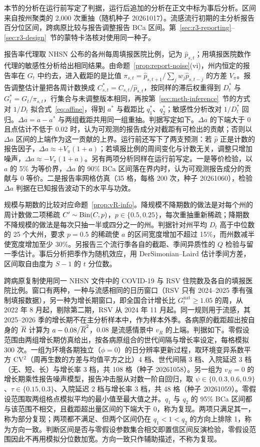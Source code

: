 本节的分析在运行前写定了判据，运行后追加的分析在正文中标为事后分析。区间来自按州聚类的 2,000 次重抽（随机种子 20261017）。流感流行初期的主分析报告百分位区间，跨病原比较与报告调整报告 BCa 区间。第~\ref{sec:r3-reporting}--\ref{sec:r3-design}~节的蒙特卡洛核对使用同一种子。

报告率代理取 NHSN 公布的各州每周填报医院比例，记为 $\hat p_{s,t}$；用填报医院数作代理的敏感性分析给出相同结果。由命题~\ref{prop:report-noise}(vi)，州内恒定的报告率在 $G_t$ 中约去，进入截距的是比值 $\pi_{s,t}=\hat p_{s,t+1}/\sum_jw_j\hat p_{s,t-j}$ 的方差 $V_\pi$。报告调整估计量把各周计数换成 $C^*_{s,t}=C_{s,t}/\hat p_{s,t}$，按同样的滞后权重得到 $D^*_t$ 与 $G^*_t=G_t/\pi_{s,t}$，行集合与未调整版本相同，再按第~\ref{sec:meth-inference}~节的方式对 $1/D_t$ 拟合式~\eqref{eq:affine}，得到 $a^*$ 与截距比 $q_1^*$、$q_2^*$；敏感性分析改对 $1/D^*_t$ 回归。$\Delta a=a-a^*$ 与两组截距共用同一组重抽。判据写定如下。$\Delta a$ 的下端大于 0 且点估计不低于 0.02 时，认为可观测的报告成分对截距有可检出的贡献；否则以 $\Delta a$ 区间的上端作为这一贡献的上界。运行前还写下了两支预测：若 $\hat p$ 正是计数的报告因子，$\Delta a\approx+V_\pi(1+a)$；若填报比例的周间变化与计数无关，调整只增加噪声，$\Delta a\approx-V_\pi(1+a)$。另有两项分析同样在运行前写定。一是等价检验，以 $a$ 的 5\% 为等价界，$\Delta a$ 的 90\% BCa 区间落在界内时，认为可观测报告成分的贡献与 0 等价。二是报告率网格仿真（35 格，每格 200 次，种子 20261060），检验 $\Delta a$ 判据在已知报告波动下的水平与功效。

规模与期数的比较对应命题~\ref{prop:vR-info}。降规模不降期数的做法是对每个州的周计数做二项稀疏 $C'\sim\operatorname{Bin}(C,p)$，$p\in\{0.5,0.25\}$，每次重抽重新稀疏；降期数不降规模的做法是每次只抽一半或四分之一的州。判据针对州平均 $D_t$ 高于中位数的 25 个大州，要求 $p=0.5$ 的稀疏使 $a$ 的区间宽度增加不超过 15\%，而州数减半使宽度增加至少 30\%。另报告三个流行季各自的截距、季间异质性的 $Q$ 检验与留一季估计。事后分析把季作为随机效应，用 DerSimonian--Laird 估计季间方差\citep{dersimonian1986meta}，区间取自由度为 $S-1$ 的 $t$ 分位数。

跨病原复制使用同一 NHSN 文件中的 COVID-19 与 RSV 住院数及各自的填报医院比例。窗口有两种，一种与流感相同的日历窗口（RSV 只有 2024--2025 季有强制填报数据），另一种为增长期窗口，即全国合计增长比 $G^{\mathrm{nat}}_t\geq1.05$ 的周，从 2022 年 8 月起，剔除第二期，RSV 从 2024 年 11 月起。同一规则用于流感，其 2025--2026 季的增长期不在主分析样本中，作为样本外季。各病原的截距超出按自身的 $\overline{R}$ 计算为 $a-0.08/\overline{R}^2$，0.08 是流感情景中 $v_R$ 的上端。判据如下。零假设范围由两组增长期仿真给出，按各病原组合的世代间隔与增长率设定，每格模拟 300 次。一组为环境各期独立（$\phi=0$）的日分辨率更新过程，取环境变异系数平方 CV$^2$（周再生数的方差与均值平方之比）4 档、世代间隔 3 档、入院延迟 3 档（无、短、长）与增长率 3 档，共 108 格（种子 20261058）。另一组为 $v_R=0$ 的增长期乘性报告噪声模型，报告冲击服从对数一阶自回归，取 $\psi\in\{0,0.3,0.6,0.9\}$、$\tau\in\{0.15,0.3\}$、入院延迟 2 档与增长率 3 档，共 48 格（种子 20261059）。零假设范围取两组格点模拟平均的最小值至最大值之并。$q_1$ 与 $q_2$ 的 95\% BCa 区间都与该范围不相交，且截距超出量区间的下端大于 0，称为复现。两项只满足其一，称为部分复现；两项都不满足、但两个区间仍在 $q_1<1<q_2$ 的方向上排除 1，称为方向一致。判断区间是否与零假设参数集合相交即置信区间反演检验，零假设范围因此不再用模拟分位数加宽。方向一致只作辅助描述，不称为复现。
